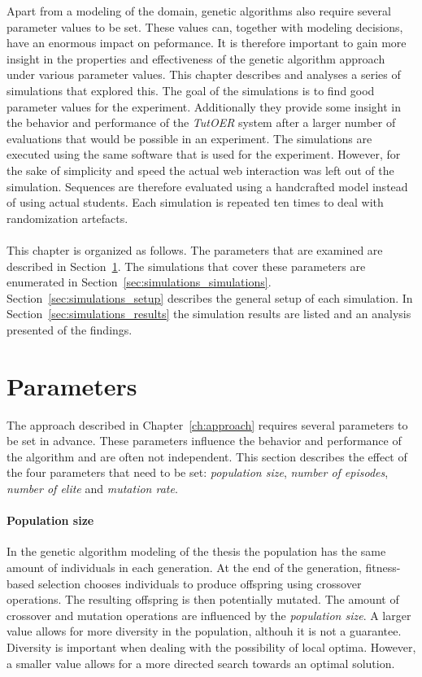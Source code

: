 Apart from a modeling of the domain, genetic algorithms also require several
parameter values to be set. These values can, together with modeling decisions,
have an enormous impact on peformance. It is therefore important to gain more
insight in the properties and effectiveness of the genetic algorithm approach
under various parameter values. This chapter describes and analyses a series of
simulations that explored this. The goal of the simulations is to find good
parameter values for the experiment. Additionally they provide some insight in
the behavior and performance of the \emph{TutOER} system after a larger number
of evaluations that would be possible in an experiment. The simulations are
executed using the same software that is used for the experiment. However, for
the sake of simplicity and speed the actual web interaction was left out of the
simulation. Sequences are therefore evaluated using a handcrafted model instead
of using actual students. Each simulation is repeated ten times to deal with
randomization artefacts.\\\\
\noindent
This chapter is organized as follows. The parameters that are examined are
described in Section~\ref{sec:simulations_parameters}.  The simulations that
cover these parameters are enumerated in
Section~\ref{sec:simulations_simulations}. Section~\ref{sec:simulations_setup}
describes the general setup of each simulation. In
Section~\ref{sec:simulations_results} the simulation results are listed and an
analysis presented of the findings.

\section{Parameters}
\label{sec:simulations_parameters}
The approach described in Chapter~\ref{ch:approach} requires several parameters
to be set in advance. These parameters influence the behavior and performance
of the algorithm and are often not independent. This section describes the
effect of the four parameters that need to be set: \emph{population size},
\emph{number of episodes}, \emph{number of elite} and \emph{mutation rate}.
\paragraph{Population size} In the genetic algorithm modeling of the thesis
the population has the same amount of individuals in each generation. At the
end of the generation, fitness-based selection chooses individuals to produce
offspring using crossover operations. The resulting offspring is then
potentially mutated. The amount of crossover and mutation operations are
influenced by the \emph{population size}. A larger value allows for more
diversity in the population, althouh it is not a guarantee. Diversity is
important when dealing with the possibility of local optima. However, a smaller
value allows for a more directed search towards an optimal solution.
